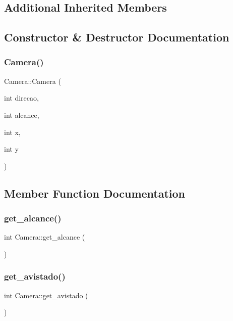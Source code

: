 \subsection*{Additional Inherited Members}


\subsection{Constructor \& Destructor Documentation}
\mbox{\label{classCamera_a297e1aba987f8418a355522e5a8b2f77}} 
\subsubsection{\texorpdfstring{Camera()}{Camera()}}
{\footnotesize\ttfamily Camera\+::\+Camera (\begin{DoxyParamCaption}\item[{int}]{direcao,  }\item[{int}]{alcance,  }\item[{int}]{x,  }\item[{int}]{y }\end{DoxyParamCaption})}



\subsection{Member Function Documentation}
\mbox{\label{classCamera_a4603e48179e827b04679fce1f485dde1}} 
\subsubsection{\texorpdfstring{get\+\_\+alcance()}{get\_alcance()}}
{\footnotesize\ttfamily int Camera\+::get\+\_\+alcance (\begin{DoxyParamCaption}{ }\end{DoxyParamCaption})}

\mbox{\label{classCamera_a9a87643bf6bde3ca94b8f51f66e85574}} 
\subsubsection{\texorpdfstring{get\+\_\+avistado()}{get\_avistado()}}
{\footnotesize\ttfamily int Camera\+::get\+\_\+avistado (\begin{DoxyParamCaption}{ }\end{DoxyParamCaption})}

